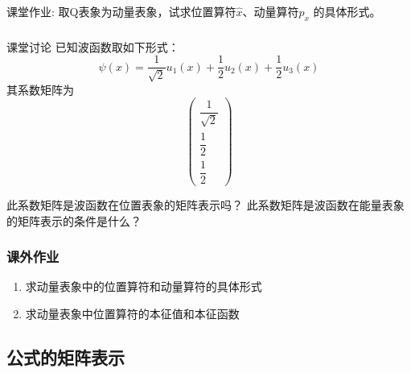 \begin{frame} 
    \frametitle{}
    \begin{exampleblock}{课堂作业:}
    取Q表象为动量表象，试求位置算符$\hat{x}$、动量算符$\hat{p}_x$ 的具体形式。
    \end{exampleblock}
\end{frame} 

\begin{frame} 
    \frametitle{}
    \begin{tcolorbox2}{课堂讨论}
    已知波函数取如下形式：$$\psi(x)=\dfrac{1}{\sqrt{2}}u_1(x)+\dfrac{1}{2}u_2(x)+\dfrac{1}{2}u_3(x)$$
    其系数矩阵为$$\begin{pmatrix}
            \dfrac{1}{\sqrt{2}}\\
            \dfrac{1}{2}\\
            \dfrac{1}{2}
            \end{pmatrix}$$
    \begin{enumerate}
        \Item  此系数矩阵是波函数在位置表象的矩阵表示吗？
        \Item  此系数矩阵是波函数在能量表象的矩阵表示的条件是什么？  
    \end{enumerate}
    \end{tcolorbox2}
\end{frame} 

\begin{frame}
    \frametitle{课外作业}
    \begin{enumerate}
        \item 求动量表象中的位置算符和动量算符的具体形式
        \item 求动量表象中位置算符的本征值和本征函数
    \end{enumerate}
\end{frame}


\subsection{公式的矩阵表示}

\begin{frame}
\end{frame} 

